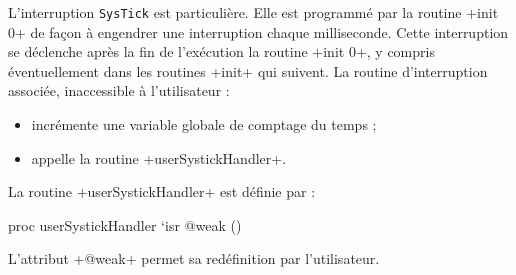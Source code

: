 
L'interruption \texttt{SysTick} est particulière. Elle est programmé par la routine \plm+init 0+ de façon à engendrer une interruption chaque milliseconde. Cette interruption se déclenche après la fin de l'exécution la routine \plm+init 0+, y compris éventuellement dans les routines \plm+init+ qui suivent. La routine d'interruption associée, inaccessible à l'utilisateur :
\begin{itemize}
  \item incrémente une variable globale de comptage du temps ;
  \item appelle la routine \plm+userSystickHandler+.
\end{itemize}

La routine \plm+userSystickHandler+ est définie par :
\begin{PLM}[1]
proc userSystickHandler `isr @weak () {
}
\end{PLM}

L'attribut \plm+@weak+ permet sa redéfinition par l'utilisateur.



